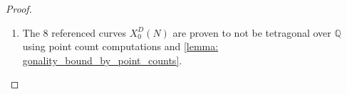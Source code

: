\documentclass[11pt,reqno]{amsart}
\newcommand{\F}{\mathbb{F}}
\newcommand{\Q}{\mathbb{Q}}
\newcommand{\C}{\mathbb{C}}
\theoremstyle{definition}
\begin{document}
\begin{proof}
\begin{enumerate}
    We now handle the last $3$ mentioned pairs using \cref{prop: NO_corollary}. For each of these three curves $X = X_0^D(N)$, there exists a quotient $Y = Y_0^D(N)/\langle w_m \rangle$ of genus $g_Y \geq 10$ such that $Y$ has a rational CM point. By \cref{lemma: CS_unique_hyperelliptic} and \cref{prop: NO_corollary}, we then have
    \[ \gamma_\C(X) \geq \gamma_\C(Y) = \gamma_\Q(Y). \]
    We then prove that $X$ is not geometrically tetragonal by exhibiting such a curve $Y$ for which point count computations and \cref{lemma: gonality_bound_by_point_counts} prove that $\gamma_\Q(Y) > 4$. For example, the genus $15$ quotient $Y = X_0^{505}(1)/\langle w_{505}\rangle$ of $X = X_0^{505}(1)$ has a rational $-3$-CM point and $Y(\F_4) = 24 > 20$, so $\gamma_\C(Y) > 4$. 
    
    \item The $8$ referenced curves $X_0^D(N)$ are proven to not be tetragonal over $\Q$ using point count computations and \cref{lemma: gonality_bound_by_point_counts}. 
\end{enumerate}
\end{proof}
\end{document}
